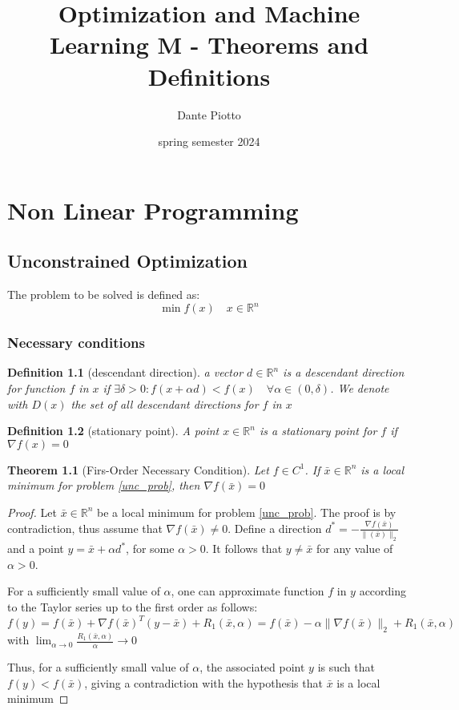 \documentclass{book}
\title{Optimization and Machine Learning M - Theorems and Definitions}
\author{Dante Piotto}
\date{spring semester 2024}
\newcommand{\R}{\mathbb{R}}
\theoremstyle{theoremv2}
\newtheorem{theorem}{Theorem}[chapter]
\theoremstyle{defv2}
\newtheorem{definition}{Definition}[chapter]
\theoremstyle{remark}
\theoremstyle{remark}
\begin{document}
\maketitle
\tableofcontents
\chapter{Non Linear Programming}
\section{Unconstrained Optimization}
The problem to be solved is defined as: 
\[
    \min f(x) \quad x \in\R^n \label{unc_prob}
\]
\subsection{Necessary conditions}
\begin{definition}[descendant direction]
    a vector $d\in\R^n$ is a \emph{descendant direction} for function $f$ in $x$ if $\exists \delta > 0 : f(x+\alpha d)<f(x) \quad \forall \alpha \in (0,\delta)$. We denote with $D(x)$ the set of all descendant directions for $f$ in $x$
\end{definition}
\begin{definition}[stationary point]
    A point $x\in\R^n$ is a \emph{stationary point} for $f$ if $\nabla f(x) = 0$
\end{definition}
\begin{theorem}[Firs-Order Necessary Condition]
    Let $f\in C^1$. If $\bar{x}\in\R^n$ is a local minimum for problem \eqref{unc_prob}, then $\nabla f(\bar{x})=0$
\end{theorem}
\begin{proof}
    Let $\bar{x}\in\R^n$ be a local minimum for problem \eqref{unc_prob}. The proof is by contradiction, thus assume that $\nabla f(\bar{x})\neq 0$. Define a direction $d^*=-\displaystyle\frac{\nabla f(\bar{x})}{\|(\bar{x})\|_2}$ and a point $y=\bar{x}+\alpha d^*$, for some $\alpha>0$. It follows that $y\neq \bar{x}$ for any value of $\alpha>0$.

    For a sufficiently small value of $\alpha$, one can approximate function $f$ in $y$ according to the Taylor series up to the first order as follows: 
    \[
        f(y) = f(\bar{x}) + \nabla f(\bar{x})^T (y-\bar{x}) +R_1(\bar{x},\alpha) = f(\bar{x}) -\alpha\|\nabla f(\bar{x})\|_2 + R_1(\bar{x},\alpha)
    \]
    with $\lim_{\alpha\to 0} \displaystyle\frac{R_1(\bar{x},\alpha)}{\alpha}\to 0$

    Thus, for a sufficiently small value of $\alpha$, the associated point $y$ is such that $f(y)<f(\bar{x})$, giving a contradiction with the hypothesis that $\bar{x}$ is a local minimum
\end{proof}
\end{document}
